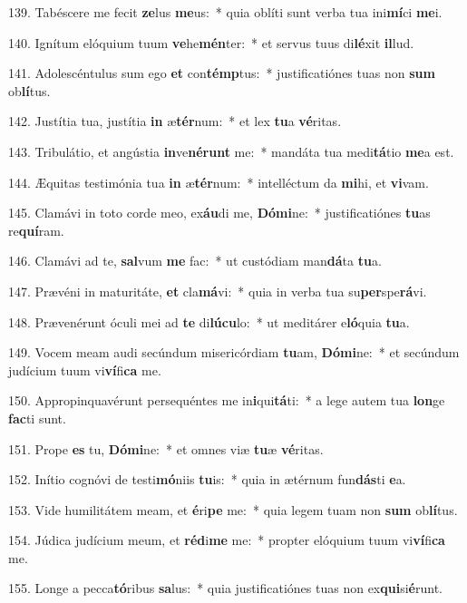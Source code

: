 139. Tabéscere me fecit \textbf{ze}lus \textbf{me}us:~*  quia oblíti sunt verba tua ini\textbf{mí}ci \textbf{me}i.\

140. Ignítum elóquium tuum \textbf{ve}he\textbf{mén}ter:~*  et servus tuus di\textbf{lé}xit \textbf{il}lud.\

141. Adolescéntulus sum ego \textbf{et} con\textbf{témp}tus:~*  justificatiónes tuas non \textbf{sum} ob\textbf{lí}tus.\

142. Justítia tua, justítia \textbf{in} æ\textbf{tér}num:~*  et lex \textbf{tu}a \textbf{vé}ritas.\

143. Tribulátio, et angústia \textbf{in}ve\textbf{né}\textbf{runt} me:~*  mandáta tua medi\textbf{tá}tio \textbf{me}a est.\

144. Æquitas testimónia tua \textbf{in} æ\textbf{tér}num:~*  intelléctum da \textbf{mi}hi, et \textbf{vi}vam.\

145. Clamávi in toto corde meo, ex\textbf{áu}di me, \textbf{Dó}\textbf{mi}ne:~*  justificatiónes \textbf{tu}as re\textbf{quí}ram.\

146. Clamávi ad te, \textbf{sal}vum \textbf{me} fac:~*  ut custódiam man\textbf{dá}ta \textbf{tu}a.\

147. Prævéni in maturitáte, \textbf{et} cla\textbf{má}vi:~*  quia in verba tua su\textbf{per}spe\textbf{rá}vi.\

148. Prævenérunt óculi mei ad \textbf{te} di\textbf{lú}\textbf{cu}lo:~*  ut meditárer e\textbf{ló}quia \textbf{tu}a.\

149. Vocem meam audi secúndum misericórdiam \textbf{tu}am, \textbf{Dó}\textbf{mi}ne:~*  et secúndum judícium tuum vi\textbf{ví}fi\textbf{ca} me.\

150. Appropinquavérunt persequéntes me in\textbf{i}qui\textbf{tá}ti:~*  a lege autem tua \textbf{lon}ge \textbf{fac}ti sunt.\

151. Prope \textbf{es} tu, \textbf{Dó}\textbf{mi}ne:~*  et omnes viæ \textbf{tu}æ \textbf{vé}ritas.\

152. Inítio cognóvi de testi\textbf{mó}niis \textbf{tu}is:~*  quia in ætérnum fun\textbf{dás}ti \textbf{e}a.\

153. Vide humilitátem meam, et \textbf{é}ri\textbf{pe} me:~*  quia legem tuam non \textbf{sum} ob\textbf{lí}tus.\

154. Júdica judícium meum, et \textbf{réd}i\textbf{me} me:~*  propter elóquium tuum vi\textbf{ví}fi\textbf{ca} me.\

155. Longe a pecca\textbf{tó}ribus \textbf{sa}lus:~*  quia justificatiónes tuas non ex\textbf{qui}si\textbf{é}runt.\

